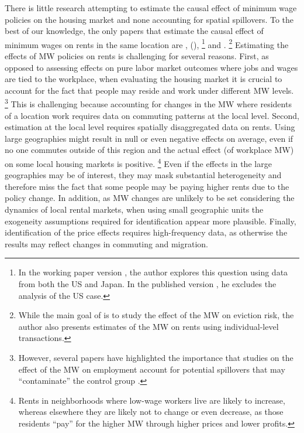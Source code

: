 
There is little research attempting to estimate the causal effect of minimum 
wage policies on the housing market and none accounting for spatial spillovers.
To the best of our knowledge, the only papers that estimate the causal effect of 
minimum wages on rents in the same location are \textcite{Tidemann2018}, 
\citeauthor{Yamagishi2019} (\citeyear{Yamagishi2019, Yamagishi2021}),%
\footnote{In the working paper version \parencite{Yamagishi2019}, the author 
explores this question using data from both the US and Japan.
In the published version \parencite{Yamagishi2021}, he excludes the analysis of 
the US case.}
and \textcite{AgarwalEtAl2021}.%
\footnote{While the main goal of \textcite{AgarwalEtAl2021} is to study the 
effect of the MW on eviction risk, the author also presents estimates of the
MW on rents using individual-level transactions.}
Estimating the effects of MW policies on rents is challenging for several 
reasons. 
First, as opposed to assessing effects on pure labor market outcomes where jobs 
and wages are tied to the workplace, when evaluating the housing market it is 
crucial to account for the fact that people may reside and work under different 
MW levels.%
\footnote{However, several papers have highlighted the importance that studies
on the effect of the MW on employment account for potential spillovers that may
``contaminate'' the control group \parencite{Kuehn2016, Huang2020}.}
This is challenging because accounting for changes in the MW where residents
of a location work requires data on commuting patterns at the local level.
Second, estimation at the local level requires spatially disaggregated data on 
rents.
Using large geographies might result in null or even negative effects on average,
even if no one commutes outside of this region and the actual effect (of 
workplace MW) on some local housing markets is positive.%
\footnote{Rents in neighborhoods where low-wage workers live are likely to 
increase, whereas elsewhere they are likely not to change or even decrease, 
as those residents ``pay'' for the higher MW through higher prices and lower 
profits.}
Even if the effects in the large geographies may be of interest, they may mask 
substantial heterogeneity and therefore miss the fact that some people may be 
paying higher rents due to the policy change.
In addition, as MW changes are unlikely to be set considering the dynamics of 
local rental markets, when using small geographic units the exogeneity assumptions 
required for identification appear more plausible.
Finally, identification of the price effects requires high-frequency data, 
as otherwise the results may reflect changes in commuting and migration.

